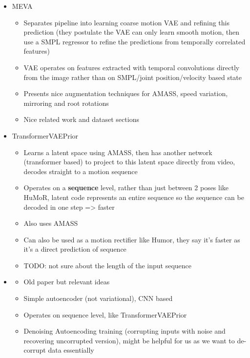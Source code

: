\begin{itemize}
\begin{itemize}
    \end{itemize}
    \item MEVA \cite{MEVA}
    \begin{itemize}
        \item Separates pipeline into learning coarse motion VAE and refining this prediction (they postulate the VAE can only learn smooth motion, then use a SMPL regressor to refine the predictions from temporally correlated features)
        \item VAE operates on features extracted with temporal convolutions directly from the image rather than on SMPL/joint position/velocity based state
        \item Presents nice augmentation techniques for AMASS, speed variation, mirroring and root rotations
        \item Nice related work and dataset sections
    \end{itemize}
    \item TransformerVAEPrior \cite{TransformerVAEPrior}
    \begin{itemize}
        \item Learns a latent space using AMASS, then has another network (transformer based) to project to this latent space directly from video, decodes straight to a motion sequence
        \item Operates on a \textbf{sequence} level, rather than just between 2 poses like HuMoR, latent code represents an entire sequence so the sequence can be decoded in one step => faster
        \item Also uses AMASS
        \item Can also be used as a motion rectifier like Humor, they say it's faster as it's a direct prediction of sequence
        \item TODO: not sure about the length of the input sequence
    \end{itemize}
    \item \cite{ConvAutoEnv2015}
    \begin{itemize}
        \item Old paper but relevant ideas
        \item Simple autoencoder (not variational), CNN based
        \item Operates on sequence level, like TransformerVAEPrior
        \item Denoising Autoencoding training (corrupting inputs with noise and recovering uncorrupted version), might be helpful for us as we want to de-corrupt data essentially

\end{itemize}
\end{itemize}
